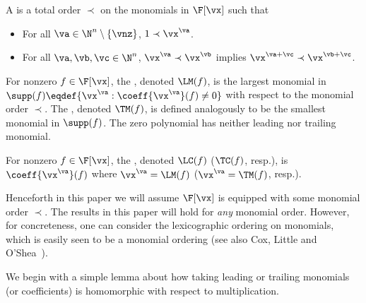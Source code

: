 \documentclass{toc}
\begin{document}
\begin{definition}
        A  is a total order $\prec$ on the monomials in $\F[\vx]$ such that
        \begin{itemize}
                \item For all $\va\in\N^n\setminus\{\vnz\}$, $1\prec \vx^{\va}$.
                \item For all $\va,\vb,\vc\in\N^n$, $\vx^\va\prec\vx^\vb$ implies $\vx^{\va+\vc}\prec\vx^{\vb+\vc}$.
        \end{itemize}

        For nonzero $f\in\F[\vx]$, the , denoted $\LM(f)$, is the largest monomial in $\supp(f)\eqdef\{\vx^\va:\coeff{\vx^\va}(f)\ne 0\}$ with respect to the monomial order $\prec$. The , denoted $\TM(f)$, is defined analogously to be the smallest monomial in $\supp(f)$. The zero polynomial has neither leading nor trailing monomial.

%
%
%
%
%
%
%
 For nonzero $f\in\F[\vx]$, the , denoted $\LC(f)$ ($\TC(f)$, resp.), is $\coeff{\vx^\va}(f)$
 where $\vx^\va=\LM(f)$ ($\vx^\va=\TM(f)$, resp.).
\end{definition}

Henceforth in this paper we will assume $\F[\vx]$ is equipped with some monomial order $\prec$.  The results in this paper will hold for \emph{any} monomial order.  However, for concreteness, one can consider the lexicographic ordering on monomials, which is easily seen to be a monomial ordering (see also Cox, Little and O'Shea~\cite{CoxLittleOShea07}).

We begin with a simple lemma about how taking leading or trailing monomials (or coefficients) is homomorphic with respect to multiplication.
\end{document}
